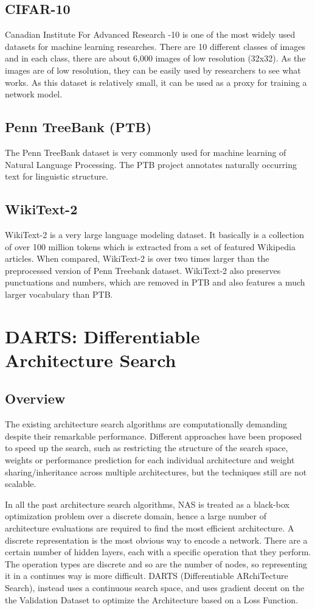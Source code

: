 \documentclass{ieee}
\begin{document}
\subsection{CIFAR-10}
Canadian Institute For Advanced Research -10 is one of the most widely used datasets for machine learning researches. There are 10 different classes of images and in each class, there are about 6,000 images of low resolution (32x32). As the images are of low resolution, they can be easily used by researchers to see what works. As this dataset is relatively small, it can be used as a proxy for training a network model.
\subsection{Penn TreeBank (PTB)}
The Penn TreeBank dataset is very commonly used for machine learning of Natural Language Processing. The PTB project annotates naturally occurring text for linguistic structure.
\subsection{WikiText-2}
WikiText-2 is a very large language modeling dataset. It basically is a collection of over 100 million tokens which is extracted from a set of featured Wikipedia articles. When compared, WikiText-2 is over two times larger than the preprocessed version of Penn Treebank dataset. WikiText-2 also preserves punctuations and numbers, which are removed in PTB and also features a much larger vocabulary than PTB.

\section{DARTS: Differentiable Architecture Search}
\subsection{Overview}
The existing architecture search algorithms are computationally demanding despite their remarkable performance. Different approaches have been proposed to speed up the search, such as restricting the structure of the search space, weights or performance prediction for each individual architecture and weight sharing/inheritance across multiple architectures, but the techniques still are not scalable. 

In all the past architecture search algorithms, NAS is treated as a black-box optimization problem over a discrete domain, hence a large number of architecture evaluations are required to find the most efficient architecture. A discrete representation is the most obvious way to encode a network. There are a certain number of hidden layers, each with a specific operation that they perform. The operation types are discrete and so are the number of nodes, so representing it in a continues way is more difficult. DARTS (Differentiable ARchiTecture Search), instead uses a continuous search space, and uses gradient decent on the the Validation Dataset to optimize the Architecture based on a Loss Function.
\end{document}
